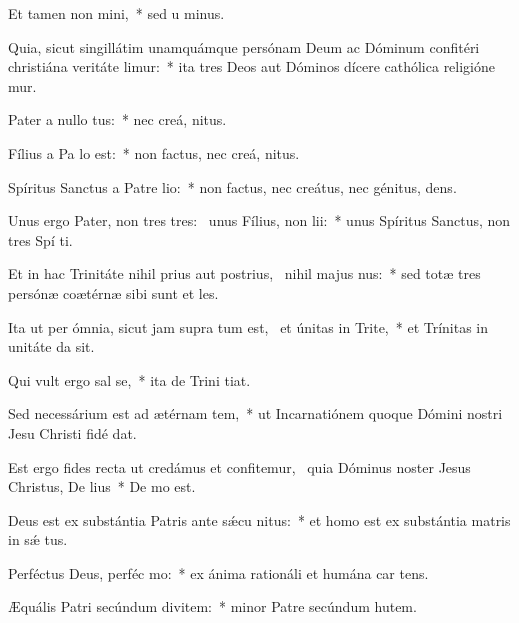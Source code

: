 \item Et tamen non  mini,~* sed u  minus.
\item Quia, sicut singillátim unamquámque persónam Deum ac Dóminum confitéri christiána veritáte limur:~* ita tres Deos aut Dóminos dícere cathólica religióne mur.
\item Pater a nullo  tus:~* nec creá,  nitus.
\item Fílius a Pa lo est:~* non factus, nec creá,  nitus.
\item Spíritus Sanctus a Patre  lio:~* non factus, nec creátus, nec génitus,  dens.
\item Unus ergo Pater, non tres tres:~\pscross{} unus Fílius, non  lii:~* unus Spíritus Sanctus, non tres Spí ti.
\item Et in hac Trinitáte nihil prius aut postrius,~\pscross{} nihil majus  nus:~* sed totæ tres persónæ coætérnæ sibi sunt et les.
\item Ita ut per ómnia, sicut jam supra tum est,~\pscross{} et únitas in Trite,~* et Trínitas in unitáte da sit.
\item Qui vult ergo sal se,~* ita de Trini tiat.
\item Sed necessárium est ad ætérnam tem,~* ut Incarnatiónem quoque Dómini nostri Jesu Christi fidé dat.
\item Est ergo fides recta ut credámus et confitemur,~\pscross{} quia Dóminus noster Jesus Christus, De lius~* De  mo est.
\item Deus est ex substántia Patris ante sǽcu nitus:~* et homo est ex substántia matris in sǽ tus.
\item Perféctus Deus, perféc mo:~* ex ánima rationáli et humána car tens.
\item Æquális Patri secúndum divitem:~* minor Patre secúndum hutem.
